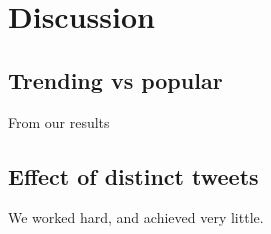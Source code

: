 \section{Discussion}\label{conclusions}
\subsection{Trending vs popular}\label{trending-discussion}
From our results
\subsection{Effect of distinct tweets}\label{trending-distinct}

We worked hard, and achieved very little.